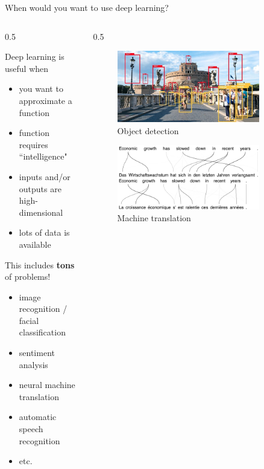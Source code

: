 \documentclass[9pt]{beamer}
\newcommand{\twocolumns}[4]{
\begin{columns}
\begin{column}{#1\textwidth}
    #3
\end{column}
\begin{column}{#2\textwidth}
	#4
\end{column}
\end{columns}
}
\begin{document}
\begin{frame}{When would you want to use deep learning?}

\twocolumns{0.5}{0.5}{
Deep learning is useful when
%
\begin{itemize}
\item you want to approximate a function
\item function requires ``intelligence"
\item inputs and/or outputs are high-dimensional
\item lots of data is available
\end{itemize}

\vspace{2em}

This includes \textbf{tons} of problems!
%
\begin{itemize}
\item image recognition / facial classification
\item sentiment analysis
\item neural machine translation
\item automatic speech recognition
\item etc.
\end{itemize}
}{
\begin{figure}
\centering
\includegraphics[width=0.85\textwidth]{dl-object-detection}
\caption{Object detection\footnotemark[1]}
\end{figure}
\begin{figure}
\includegraphics[width=0.85\textwidth]{dl-neural-machine-translation}
\caption{Machine translation\footnotemark[2]}
\end{figure}
}


\end{frame}
\end{document}
